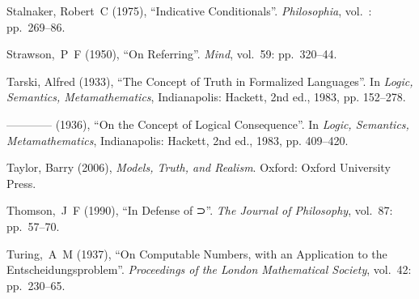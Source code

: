 \documentclass[openany,leqno,10pt]{book}
\theoremstyle{break}
\theoremstyle{definition}
\theoremstyle{remark}
\begin{document}
{\begin{thebibliography}{39}
Stalnaker, Robert~C (1975), \enquote{Indicative Conditionals}. \emph{Philosophia}, vol.~: pp.~269–86.


Strawson,~P~F (1950), \enquote{On Referring}. \emph{Mind}, vol.~59:
  pp.~320–44.

Tarski, Alfred (1933), \enquote{The Concept of Truth in Formalized Languages}. 
  In \emph{Logic, Semantics, Metamathematics}, Indianapolis: Hackett, 2nd ed., 1983, pp.
  152–278.

---\!\!---\!\!---\!\!--- (1936), \enquote{On the Concept of Logical Consequence}. 
  In \emph{Logic, Semantics, Metamathematics}, Indianapolis: Hackett, 2nd ed., 1983, pp. 409–420.



Taylor, Barry (2006), \emph{Models, Truth, and Realism}. Oxford: Oxford
  University Press.

Thomson,~J~F (1990), \enquote{In Defense of ⊃}. \emph{The Journal of Philosophy}, vol.~87: pp.~57–70.

Turing,~A~M (1937), \enquote{On Computable Numbers, with an Application to  the Entscheidungsproblem}. \emph{Proceedings of the London Mathematical
  Society}, vol.~42: pp.~230–65.

\end{thebibliography}
}






	
\end{document}
